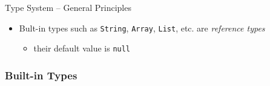 \documentclass[presentation]{beamer}
\begin{document}
\begin{frame}{\dotnet Type System -- General Principles}
\begin{itemize}
        \vfill

        \item Bult-in types such as \texttt{String}, \texttt{Array}, \texttt{List}, etc. are \emph{reference types}
        \begin{itemize}
            \item their default value is \texttt{null}
        \end{itemize}

    \end{itemize}
\end{frame}

\subsubsection{Built-in Types}
\end{document}
